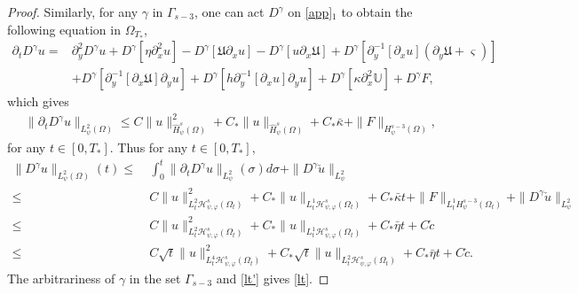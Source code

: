 \documentclass{amsart}
\numberwithin{equation}{section}
\begin{document}
\begin{proof}
Similarly, for any $\gamma$ in $\Gamma_{s-3}$, one can  act $D^{\gamma}$ on \eqref{app}$_{1}$ to obtain the following equation in $\Omega_{T_{*}}$,
\begin{align*}
\partial_{t}D^{\gamma}u
=& \partial_{y}^{2}D^{\gamma}u
  +D^{\gamma}[\eta\partial_{x}^{2}u]
  -D^{\gamma}[\mathfrak{U}\partial_{x}u]
  -D^{\gamma}[u\partial_{x}\mathfrak{U}]
  +D^{\gamma}[\partial_{y}^{-1}[\partial_{x}u](\partial_{y}\mathfrak{U}+\varsigma)]\\
 &+D^{\gamma}[\partial_{y}^{-1}[\partial_{x}\mathfrak{U}]\partial_{y}u]
  +D^{\gamma}[h\partial_{y}^{-1}[\partial_{x}u]\partial_{y}u]
  +D^{\gamma}[\kappa\partial_{x}^{2}\mathbb{U}]
  +D^{\gamma}F,\nonumber
\end{align*}
which gives
\begin{align}\label{dte}
\|\partial_{t}D^{\gamma}u\|_{L_{\psi}^{2}(\Omega)}
\leq C\|u\|_{\hat{H}_{\psi}^{s}(\Omega)}^{2}
    +C_{*}\|u\|_{\hat{H}_{\psi}^{s}(\Omega)}
    +C_{*}\bar{\kappa}
    +\|F\|_{H_{\psi}^{s-3}(\Omega)},
\end{align}
for any $t\in[0,T_{*}]$. Thus for any $t\in[0,T_{*}]$,
\begin{align}\label{lt'}
\|D^{\gamma}u\|_{L_{\psi}^{2}(\Omega)}(t)
\leq&~\int_{0}^{t}\|\partial_{t}D^{\gamma}u\|_{L_{\psi}^{2}}(\sigma)d\sigma
      +\|D^{\gamma}\check{u}\|_{L_{\psi}^{2}}\\
\leq&~C\|u\|_{L_{t}^{2}\mathcal{H}_{\psi,\varphi}^{s}(\Omega_{t})}^{2}
    +C_{*}\|u\|_{L_{t}^{1}\mathcal{H}_{\psi,\varphi}^{s}(\Omega_{t})}
    +C_{*}\bar{\kappa}t
    +\|F\|_{L_{t}^{1}H_{\psi}^{s-3}(\Omega_{t})}
    +\|D^{\gamma}\check{u}\|_{L_{\psi}^{2}}\nonumber\\
\leq&~C\|u\|_{L_{t}^{2}\mathcal{H}_{\psi,\varphi}^{s}(\Omega_{t})}^{2}
     +C_{*}\|u\|_{L_{t}^{1}\mathcal{H}_{\psi,\varphi}^{s}(\Omega_{t})}
     +C_{*}\bar{\eta}t
     +C\check{c}\nonumber\\
\leq&~C\sqrt{t}\|u\|_{L_{t}^{4}\mathcal{H}_{\psi,\varphi}^{s}(\Omega_{t})}^{2}
     +C_{*}\sqrt{t}\|u\|_{L_{t}^{2}\mathcal{H}_{\psi,\varphi}^{s}(\Omega_{t})}
     +C_{*}\bar{\eta}t
     +C\check{c}.\nonumber
\end{align}
The arbitrariness of $\gamma$ in the set $\Gamma_{s-3}$ and \eqref{lt'} gives \eqref{lt}.
\end{proof}
\end{document}
